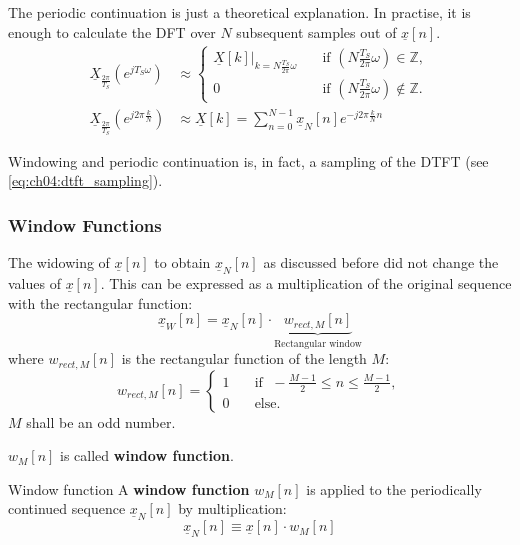 \begin{refsection}
The periodic continuation is just a theoretical explanation. In practise, it is enough to calculate the \ac{DFT} over $N$ subsequent samples out of $\underline{x}[n]$.
\begin{equation}
	\begin{split}
		\underline{X}_{\frac{2\pi}{T_S}}\left(e^{j T_S \omega}\right) &\approx \begin{cases}
			\left.\underline{X}[k]\right|_{k = N \frac{T_S}{2\pi} \omega} & \quad \text{if } \left(N \frac{T_S}{2\pi} \omega\right) \in \mathbb{Z}, \\
			0 & \quad \text{if } \left(N \frac{T_S}{2\pi} \omega\right) \notin \mathbb{Z}.
		\end{cases} \\
		\underline{X}_{\frac{2\pi}{T_S}}\left(e^{j 2 \pi \frac{k}{N}}\right) &\approx \underline{X}[k] = \sum\limits_{n=0}^{N-1} \underline{x}_N[n] e^{-j 2 \pi \frac{k}{N} n}
	\end{split}
	\label{eq:ch04:dtft_sampling}
\end{equation}

Windowing and periodic continuation is, in fact, a sampling of the \ac{DTFT} (see \eqref{eq:ch04:dtft_sampling}).

\subsubsection{Window Functions}

The widowing of $\underline{x}[n]$ to obtain $\underline{x}_N[n]$ as discussed before did not change the values of $\underline{x}[n]$. This can be expressed as a multiplication of the original sequence with the rectangular function:
\begin{equation}
	\underline{x}_W[n] = \underline{x}_N[n] \cdot \underbrace{w_{rect,M}[n]}_{\text{Rectangular window}}
\end{equation}
where $w_{rect,M}[n]$ is the rectangular function of the length $M$:
\begin{equation}
	w_{rect,M}[n] = \begin{cases}
		1 &\quad \text{if } \; -\frac{M-1}{2} \leq n \leq \frac{M-1}{2}, \\
		0 &\quad \text{else}.
	\end{cases}
\end{equation}
$M$ shall be an odd number.

$w_M[n]$ is called  \textbf{window function}.
\begin{definition}{Window function}
	A  \textbf{window function} $w_M[n]$ is applied to the periodically continued sequence $\underline{x}_N[n]$ by multiplication:
	\begin{equation}
		\underline{x}_N[n] \equiv \underline{x}[n] \cdot w_M[n]
	\end{equation}
	

\end{definition}
\end{refsection}

